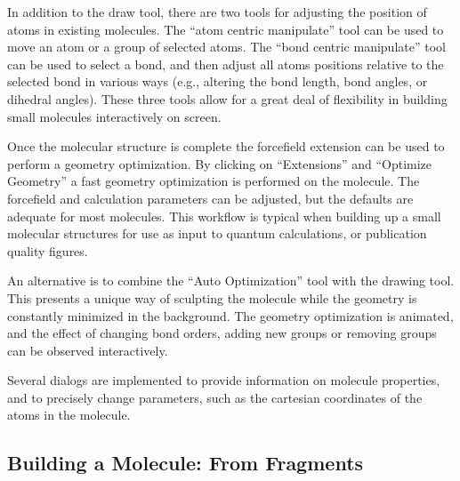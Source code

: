 \documentclass[10pt]{bmc_article}
\newenvironment{bmcformat}{\begin{raggedright}
\baselineskip20pt\sloppy\setboolean{publ}{false}}{\end{raggedright}
\baselineskip20pt\sloppy}
\begin{document}
\begin{bmcformat}
In addition to the draw tool, there are two tools for adjusting the position of
atoms in existing molecules. The ``atom centric manipulate'' tool can be used to
move an atom or a group of selected atoms. The ``bond centric manipulate'' tool
can
be used to select a bond, and then adjust all atoms positions relative to the
selected bond in various ways (e.g., altering the bond length, bond
angles, or dihedral angles). These three tools allow for a great deal of
flexibility in building small molecules interactively on screen.

Once the molecular structure is complete the forcefield extension can be used to
perform a geometry optimization. By clicking on ``Extensions'' and ``Optimize
Geometry'' a fast geometry optimization is performed on the molecule. The
forcefield and calculation parameters can be adjusted, but the defaults are
adequate for most molecules. This workflow is typical when building up a small
molecular structures for use as input to quantum calculations, or publication
quality figures.

An alternative is to combine the ``Auto Optimization'' tool with the drawing
tool. This presents a unique way of sculpting the molecule while the geometry is
constantly minimized in the background. The geometry optimization is animated,
and the effect of changing bond orders, adding new groups or removing groups can
be observed interactively.

Several dialogs are implemented to provide information on molecule properties,
and to precisely change parameters, such as the cartesian coordinates of the atoms
in the molecule.

\subsection{Building a Molecule: From Fragments}


\end{bmcformat}
\end{document}
